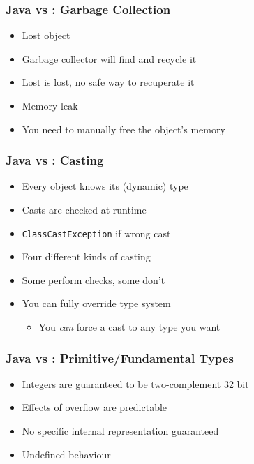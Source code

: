 \begin{frame}
  \frametitle{Java vs \cpp: Garbage Collection}
  \begin{itemize}
    \item Lost object
    \item Garbage collector will find and recycle it
  \end{itemize}
  \vskip2mm
  \structure{\cpp}
  \begin{itemize}
    \item Lost is lost, no safe way to recuperate it
    \item Memory leak
    \item You need to manually free the object's memory
  \end{itemize}
\end{frame}

\begin{frame}
  \frametitle{Java vs \cpp: Casting}
  \begin{itemize}
    \item Every object knows its (dynamic) type
    \item Casts are checked at runtime
    \item \texttt{ClassCastException} if wrong cast
  \end{itemize}
  \vskip2mm
  \structure{\cpp}
  \begin{itemize}
    \item Four different kinds of casting
    \item Some perform checks, some don't
    \item You can fully override type system
          \begin{itemize}
            \item You \emph{can} force a cast to any type you want
          \end{itemize}
  \end{itemize}
\end{frame}

\begin{frame}
  \frametitle{Java vs \cpp: Primitive/Fundamental Types}
  \begin{itemize}
    \item Integers are guaranteed to be two-complement 32 bit
    \item Effects of overflow are predictable
  \end{itemize}
  \vskip2mm
  \structure{\cpp}
  \begin{itemize}
    \item No specific internal representation guaranteed 
    \item Undefined behaviour
  \end{itemize}
\end{frame}

